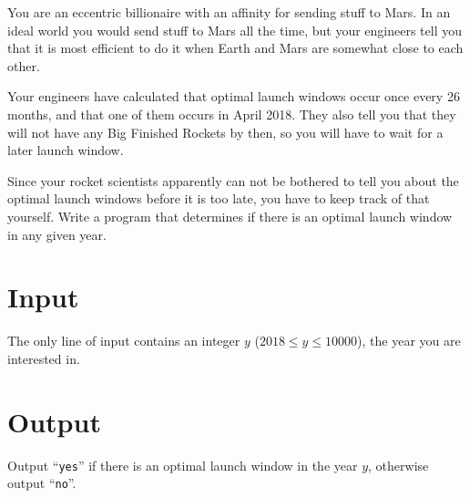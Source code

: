 
%
\noindent
You are an eccentric billionaire with an affinity for sending stuff to Mars. In an ideal world you would send stuff to Mars all the time, but your engineers tell you that it is most efficient to do it when Earth and Mars are somewhat close to each other.

Your engineers have calculated that optimal launch windows occur once every 26 months, and that one of them occurs in April 2018. They also tell you that they will not have any Big Finished Rockets by then, so you will have to wait for a later launch window.

Since your rocket scientists apparently can not be bothered to tell you about the optimal launch windows before it is too late, you have to keep track of that yourself. Write a program that determines if there is an optimal launch window in any given year.

\section*{Input}
The only line of input contains an integer $y$ ($2018 \le y \le 10000$), the year you are interested in.

\section*{Output}
Output ``\texttt{yes}'' if there is an optimal launch window in the year $y$, otherwise output ``\texttt{no}''.
